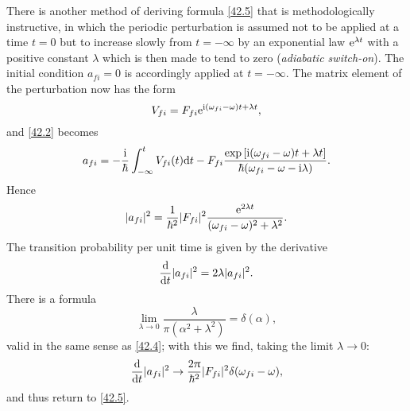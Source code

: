 There is another method of deriving formula \eqref{42.5} that is methodologically instructive, in which the periodic perturbation is assumed not to be applied at a time $ t = 0 $ but to increase slowly from $ t = -\infty$ by an exponential law $ \mathrm{e}^{\lambda t} $ with a positive constant $\lambda$ which is then made to tend to zero (\textit{adiabatic switch-on}). The initial condition $ a_{fi} = 0 $ is accordingly applied at $ t = -\infty $. The matrix element of the perturbation now has the form
\[ V_{fi}=F_{fi}\mathrm{e}^{\mathrm{i}(\omega_{fi}-\omega)t+\lambda t}, \]
and \eqref{42.2} becomes
\begin{equation}\label{42.7}
a_{fi}=-\frac{\mathrm{i}}{\hbar}\int_{-\infty}^{t}V_{fi}(t)\mathrm{d} t-F_{fi}\frac{\exp\left[\mathrm{i}(\omega_{fi}-\omega)t+\lambda t \right]}{\hbar(\omega_{fi}-\omega-\mathrm{i}\lambda)}.
\end{equation}
Hence
\[ |a_{fi}|^2=\frac{1}{\hbar^2}|F_{fi}|^2\frac{\mathrm{e}^{2\lambda t}}{(\omega_{fi}-\omega)^2+\lambda^2}. \]
The transition probability per unit time is given by the derivative
\[ \frac{\mathrm{d}}{\mathrm{d} t}|a_{fi}|^2=2\lambda|a_{fi}|^2. \]
There is a formula
\begin{equation}\label{42.8}
\lim\limits_{\lambda\to0}\frac{\lambda}{\pi(\alpha^2+\lambda^2)}=\delta(\alpha),
\end{equation}
valid in the same sense as \eqref{42.4}; with this we find, taking the limit $ \lambda\to 0 $:
\[ \frac{\mathrm{d}}{\mathrm{d} t}|a_{fi}|^2\to\frac{2\uppi}{\hbar^2}|F_{fi}|^2\delta(\omega_{fi}-\omega), \]
and thus return to \eqref{42.5}.

